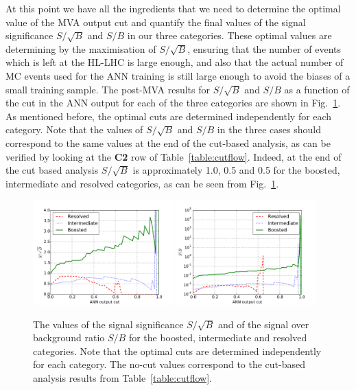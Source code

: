 At this point we have all the ingredients that we need to determine the optimal
value of the MVA output cut and quantify the final values of the signal
significance $S/\sqrt{B}$ and $S/B$ in our three categories.
%
These optimal values are determining by the maximisation of $S/\sqrt{B}$,
ensuring that the number of events which is left at the HL-LHC is large
enough, and also that the actual number of MC events used for the ANN training
is still large enough to avoid the biases of a small training sample.
%
The post-MVA results for $S/\sqrt{B}$ and $S/B$ as a function of the cut
in the ANN output for each of the three categories are shown in
Fig.~\ref{fig:sb_mva}.
%
As mentioned before, the optimal cuts are determined independently for each
category.
%
Note that the values of $S/\sqrt{B}$ and $S/B$ in the three cases should correspond
to the same values at the end of the cut-based analysis, as
can be verified by looking at the {\bf C2} row of Table~\ref{table:cutflow}.
%
Indeed, at the end of the cut based analysis $S/\sqrt{B}$ is approximately
1.0, 0.5 and 0.5 for the boosted, intermediate and resolved
categories, as can be seen from Fig.~\ref{fig:sb_mva}.

\begin{figure}[t]
\begin{center}
\includegraphics[width=0.48\textwidth]{plots/ssb.pdf}
\includegraphics[width=0.48\textwidth]{plots/sb.pdf}
\caption{\small
  The values of the signal significance $S/\sqrt{B}$ and of the
  signal over background ratio $S/B$ for the boosted, intermediate
  and resolved categories.
  Note that the optimal cuts are determined independently for each
  category.
  The no-cut values correspond to the  cut-based analysis
  results from Table~\ref{table:cutflow}.
}
\label{fig:sb_mva}
\end{center}
\end{figure}

